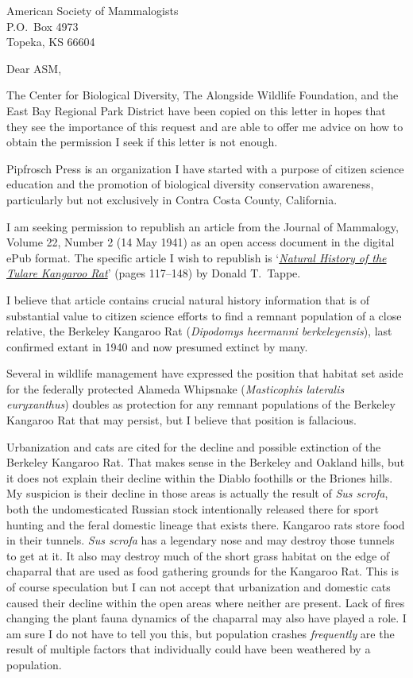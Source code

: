 \documentclass[letterpaper,11pt]{letter}
\begin{document}
\begin{letter}{American Society of Mammalogists\\P.O.\ Box 4973\\Topeka, KS 66604}

\opening{Dear ASM,}

The Center for Biological Diversity, The Alongside Wildlife Foundation, and the East Bay Regional Park District have been copied on this letter in hopes that they see the importance of this request and are able to offer me advice on how to obtain the permission I seek if this letter is not enough.

Pipfrosch Press is an organization I have started with a purpose of citizen science education and the promotion of biological diversity conservation awareness, particularly but not exclusively in Contra Costa County, California.

I am seeking permission to republish an article from the Journal of Mammalogy, Volume 22, Number 2 (14 May 1941) as an open access document in the digital ePub format. The specific article I wish to republish is `\textit{\ul{Natural History of the Tulare Kangaroo Rat}}' (pages 117--148) by Donald T.\ Tappe.

I believe that article contains crucial natural history information that is of substantial value to citizen science efforts to find a remnant population of a close relative, the Berkeley Kangaroo Rat (\textit{Dipodomys heermanni berkeleyensis}), last confirmed extant in 1940 and now presumed extinct by many.

Several in wildlife management have expressed the position that habitat set aside for the federally protected Alameda Whipsnake (\textit{Masticophis lateralis euryxanthus}) doubles as protection for any remnant populations of the Berkeley Kangaroo Rat that may persist, but I believe that position is fallacious.

Urbanization and cats are cited for the decline and possible extinction of the Berkeley Kangaroo Rat. That makes sense in the Berkeley and Oakland hills, but it does not explain their decline within the Diablo foothills or the Briones hills. My suspicion is their decline in those areas is actually the result of \textit{Sus scrofa}, both the undomesticated Russian stock intentionally released there for sport hunting and the feral domestic lineage that exists there. Kangaroo rats store food in their tunnels. \textit{Sus scrofa} has a legendary nose and may destroy those tunnels to get at it. It also may destroy much of the short grass habitat on the edge of chaparral that are used as food gathering grounds for the Kangaroo Rat. This is of course speculation but I can not accept that urbanization and domestic cats caused their decline within the open areas where neither are present. Lack of fires changing the plant fauna dynamics of the chaparral may also have played a role. I am sure I do not have to tell you this, but population crashes \emph{frequently} are the result of multiple factors that individually could have been weathered by a population.


\end{letter}
\end{document}
